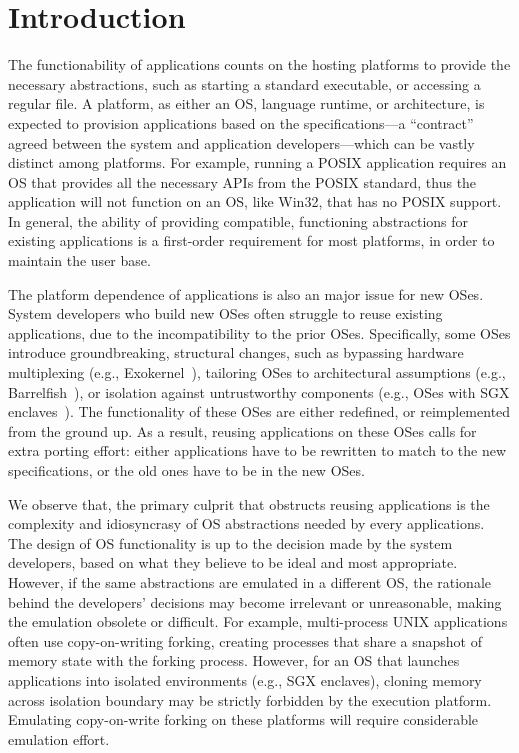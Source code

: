 \chapter{Introduction}
\label{chap:intro}

The functionability of applications counts on the hosting platforms
to provide the necessary abstractions,
such as starting a standard executable, or accessing a regular file.
A platform, as either an OS, language runtime, or architecture, is expected to provision applications
based on the specifications---a ``contract'' agreed between the system and application developers---which can be vastly distinct among platforms.
For example, running a POSIX application
requires an OS that provides all the necessary APIs from the POSIX standard,
thus the application will not function
on an OS, like Win32, that has no POSIX support.
In general, the ability of providing compatible, functioning abstractions for existing applications
is a first-order requirement for most platforms,
in order to maintain the user base.

The platform dependence of applications is also an major issue for new OSes.
System developers who build new OSes often struggle to reuse existing applications,
due to the incompatibility to the prior OSes.
Specifically, some OSes introduce groundbreaking, structural changes, such as
bypassing hardware multiplexing (e.g., Exokernel~\citep{engler95exokernel}),
tailoring OSes to architectural assumptions (e.g., Barrelfish~\citep{baumann09barrelfish}),
or isolation against untrustworthy components (e.g., OSes with SGX enclaves~\citep{intelsgx}).
The functionality of these OSes are either redefined, or reimplemented from the ground up.
As a result, reusing applications on these OSes
calls for extra porting effort:
either applications have to be rewritten to match to the new specifications,
or the old ones have to be  in the new OSes.


We observe that, the primary culprit that obstructs reusing applications
is the complexity and idiosyncrasy of OS abstractions needed by every applications.
The design of OS functionality is up to the decision made by the system developers,
based on what they believe to be ideal and most appropriate.
However, if the same abstractions are emulated in a different OS,
the rationale behind the developers' decisions may become irrelevant or unreasonable,
making the emulation obsolete or difficult.
For example, multi-process UNIX applications often use copy-on-writing forking,
creating processes that share a snapshot of memory state with the forking process.
However, for an OS that launches applications into isolated environments (e.g., SGX enclaves),
cloning memory across isolation boundary
may be strictly forbidden by the execution platform.
Emulating copy-on-write forking on these platforms will require considerable emulation effort.



